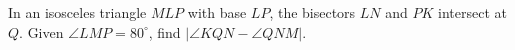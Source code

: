 In an isosceles triangle $MLP$ with base $LP$, the bisectors $LN$ and $PK$ intersect at $Q$. Given $\angle LMP=80^{\circ}$, find $|\angle KQN-\angle QNM|$.
